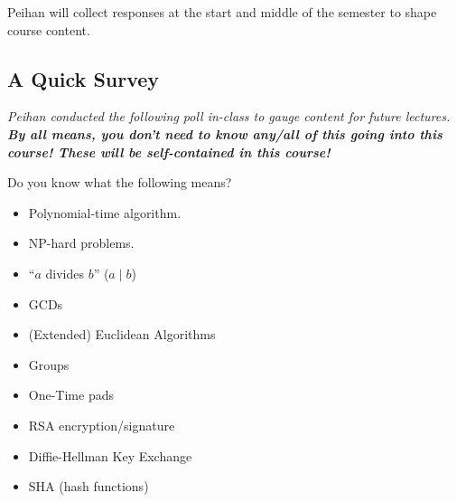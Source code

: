 Peihan will collect responses at the start and middle of the semester to shape course content.

\subsection{A Quick Survey}
\emph{Peihan conducted the following poll in-class to gauge content for future lectures. \textbf{By all means, you don't need to know any/all of this going into this course! These will be self-contained in this course!}}

Do you know what the following means?
\begin{itemize}
    \item Polynomial-time algorithm.
    \item \textsf{NP}-hard problems.
    \item ``$a$ divides $b$'' ($a\mid b$)
    \item GCDs
    \item (Extended) Euclidean Algorithms
    \item Groups
    \item One-Time pads
    \item RSA encryption/signature
    \item Diffie-Hellman Key Exchange
    \item SHA (hash functions)
\end{itemize}
